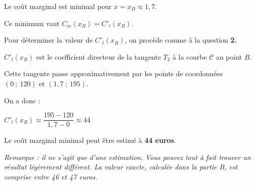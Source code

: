 \begin{corrige}
\begin{enumerate}
\begin{center}
\begin{extern}
               \end{extern}
          \end{center}
          Le coût marginal est minimal pour $x=x_B \approx 1,7$.
          \par
          Ce minimum vaut $C_m(x_B)=C'_t(x_B)$.
          \par
          Pour déterminer la valeur de $C'_t(x_B)$, on procède comme à la question \textbf{2.}
          \par
          $C'_t(x_B)$ est le coefficient directeur de la tangente $T_2$ à la courbe $\mathscr{C}$ au point $B$.
          \par
          Cette tangente passe approximativement par les points de coordonnées $(0~;~120)$ et $(1,7~;~195)$.
          \par
          On a donc :
          \par
          $C'_t(x_B) \approx \dfrac{195-120}{1,7-0} \approx 44$
          \par
          Le coût marginal minimal peut être estimé à \textbf{44 euros}.
          \par
          \textit{Remarque : il ne s'agit que d'une estimation. Vous pouvez tout à fait trouver un résultat légèrement différent. La valeur exacte, calculée dans la partie B, est comprise entre 46 et 47 euros.}
          \par
     \end{enumerate}
     \par

\end{corrige}
